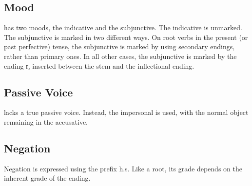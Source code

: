\subsection{Mood}
\Langname{} has two moods, the indicative and the subjunctive. The indicative
is unmarked. The subjunctive is marked in two different ways. On root verbs in
the present (or past perfective) tense, the subjunctive is marked by using
secondary endings, rather than primary ones. In all other cases, the
subjunctive is marked by the ending {\ll r̩}, inserted between the stem and the
inflectional ending.

\subsection{Passive Voice}
\Langname{} lacks a true passive voice. Instead, the impersonal is used, with
the normal object remaining in the accusative.

\subsection{Negation}
Negation is expressed using the prefix {\ll h.s}. Like a root, its grade
depends on the inherent grade of the ending.


